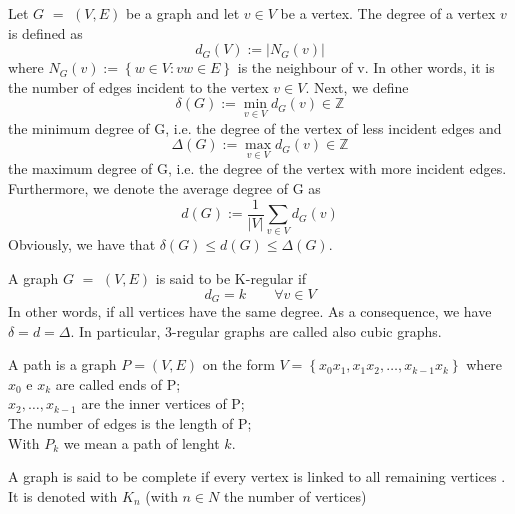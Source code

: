 \begin{definition}
Let $G$ $=$ $(V,E)$ be a graph and let $v \in V$ be a vertex. The degree of a vertex $v$ is defined as
\begin{equation*}
d_{G}(V) := |N_{G}(v)|
\end{equation*}
where $N_{G}(v) := \left \{ w \in V : vw \in E \right \}$ is the neighbour of v. In other words, it is the number of edges incident to the vertex $v \in V$.
Next, we define
\begin{equation*}
\delta(G) := \min\limits_{v \in V} d_{G}(v) \in \mathbb{Z}
\end{equation*}
the minimum degree of G, i.e. the degree of the vertex of less incident edges and
\begin{equation*}
\Delta(G) := \max\limits_{v \in V} d_{G}(v) \in \mathbb{Z}
\end{equation*}
the maximum degree of G, i.e. the degree of the vertex with more incident edges.
Furthermore, we denote the average degree of G as
\begin{equation*}
d(G) := \frac{1}{|V|} \sum_{v \in V} d_{G}(v)
\end{equation*}
Obviously, we have that $\delta(G) \le d(G) \le \Delta(G)$.
\end{definition}

\begin{definition}
A graph $G$ $=$ $(V,E)$ is said to be K-regular if 
\begin{equation*}
d_{G} = k \qquad \forall v \in V
\end{equation*}
In other words, if all vertices have the same degree. As a consequence, we have $\delta = d = \Delta$.
In particular, 3-regular graphs are called also cubic graphs.
\end{definition}

\begin{definition}
A path is a graph $P = (V,E)$ on the form $V = \left \{x_{0}x_{1}, x_{1}x_{2}, \dots, x_{k-1}x_{k} \right \}$ where\\
$x_{0}$ e $x_{k}$ are called ends of P;\\
$x_{2}, \dots, x_{k-1}$ are the inner vertices of P;\\
The number of edges is the length of P;\\ 
With $P_{k}$ we mean a path of lenght $k$.
\end{definition}

\begin{definition}
A graph is said to be complete if every vertex is linked to all remaining vertices . It is denoted with $K_{n}$ (with $n \in N $ the number of vertices)
\end{definition}

